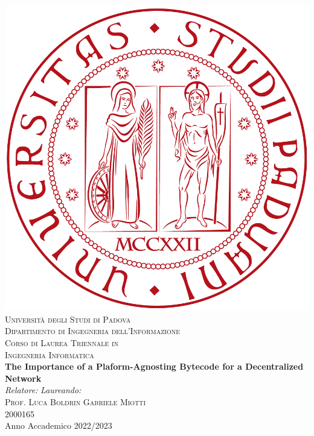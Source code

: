 



\begin{titlepage}
\begin{center}
\includegraphics[scale=0.1]{images/logo.png}\\

\vspace{0.8cm}
\textsc{\LARGE Universit\`{a} degli Studi di Padova}\\
\vspace{0.45cm}
\textsc{\large Dipartimento di Ingegneria dell'Informazione}\\
\vspace{0.4cm}
\textsc{\large Corso di Laurea Triennale in}\\
\textsc{\large Ingegneria Informatica}\\
\vfill
{ \LARGE \bfseries The Importance of a Plaform-Agnosting Bytecode for a Decentralized Network
}\\
\vfill
\textit{\large Relatore:} \hfill \textit{\large Laureando:}\\
\textsc{\large Prof. Luca Boldrin} \hfill \textsc{Gabriele Miotti}\\
\hfill \textsc{2000165}\\

\vfill
{\large Anno Accademico 2022/2023}
\end{center}
\end{titlepage}

